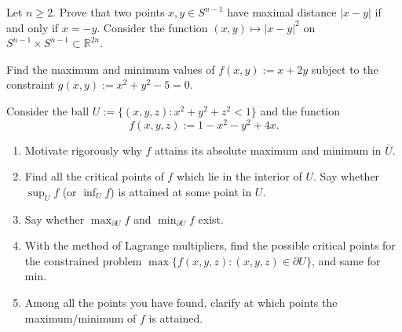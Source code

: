 \begin{exercise}
\label{ex:antipodal_max_distance}
Let $n \geq 2$. Prove that two points $x,y \in S^{n-1}$ have maximal distance $|x-y|$ if and
only if $x = -y$. Consider the function $(x,y) \mapsto |x-y|^2$ on
$S^{n-1}\times S^{n-1} \subset \mathbb{R}^{2n}$.
\end{exercise}

\begin{aiexercise}
\label{ex:ai_lagrange_circle}
Find the maximum and minimum values of $f(x,y) := x + 2y$ subject to the constraint $g(x,y) := x^2 + y^2 - 5 = 0$.
\end{aiexercise}




\begin{exercise}
\label{ex:lagrange_ball_extrema}
Consider the ball $U := \{(x,y,z) : x^2+y^2+z^2 < 1\}$ and the function
\[f(x,y,z) := 1 - x^2 - y^2 + 4x.\]
\begin{enumerate}[label=\textbf{(\alph*)}]
  \item Motivate rigorously why $f$ attains its absolute maximum and minimum in $\overline{U}$.
  \item Find all the critical points of $f$ which lie in the interior of $U$. Say whether
    $\sup_U f$ (or $\inf_U f$) is attained at some point in $U$.
  \item Say whether $\max_{\partial U} f$ and $\min_{\partial U} f$ exist.
  \item With the method of Lagrange multipliers, find the possible critical points for the
    constrained problem $\max\{f(x,y,z) : (x,y,z) \in \partial U\}$, and same for min.
  \item Among all the points you have found, clarify at which points the maximum/minimum of $f$
    is attained.
\end{enumerate}
\end{exercise}

